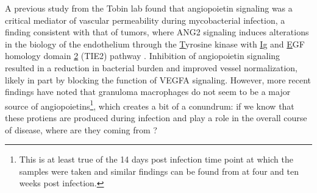 A previous study from the Tobin lab found that angiopoietin signaling was a critical mediator of vascular permeability during mycobacterial infection, a finding consistent with that of tumors, where ANG2 signaling induces alterations in the biology of the endothelium through the \underline{T}yrosine kinase with \underline{I}g and \underline{E}GF homology domain \underline{2} (TIE2) pathway \citep{Goel2012, Thurston2012, Oehlers2017, Duran2021}. Inhibition of angiopoietin signaling resulted in a reduction in bacterial burden and improved vessel normalization, likely in part by blocking the function of VEGFA signaling. However, more recent findings have noted that granuloma macrophages do not seem to be a major source of angiopoietins\footnote{This is at least true of the 14 days post infection time point at which the samples were taken and similar findings can be found from \citet{Gideon2022} at four and ten weeks post infection.}, which creates a bit of a conundrum: if we know that these protiens are produced during infection and play a role in the overall course of disease, where are they coming from \citep{Cronan2021}?

